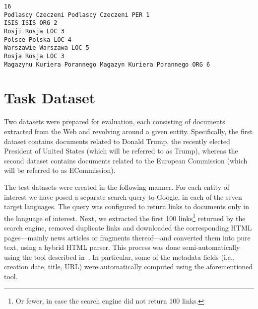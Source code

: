 \documentclass[11pt]{article}
\begin{document}
\begin{small}
\begin{verbatim}
16
Podlascy Czeczeni Podlascy Czeczeni PER 1
ISIS ISIS ORG 2
Rosji Rosja LOC 3
Polsce Polska LOC 4
Warszawie Warszawa LOC 5
Rosja Rosja LOC 3
Magazynu Kuriera Porannego Magazyn Kuriera Porannego ORG 6
\end{verbatim}	    
\end{small}

\section{Task Dataset}
\label{sec:annotation}

Two datasets were prepared for evaluation, each consisting of documents
extracted from the Web and revolving around a given entity.
Specifically, the first dataset contains documents related to Donald
Trump, the recently elected President of United States (which will be
referred to as {\sc Trump}), whereas the second dataset contains
documents related to the European Commission (which will be referred to
as {\sc ECommission}).

The test datasets were created in the following manner.  For each entity
of interest we have posed a separate search query to Google, in each of
the seven target languages.  The query was configured to return links to
documents only in the language of interest.  Next, we extracted the first
100 links\footnote{Or fewer, in case the search engine did not return 100
  links.} returned by the search engine, removed duplicate links and
downloaded the corresponding HTML pages---mainly news articles or
fragments thereof---and converted them into pure text, using a hybrid
HTML parser.  This process was done semi-automatically using the tool
described in~\cite{Crawley:ea:2010}.  In particular, some of the metadata
fields (i.e., creation date, title, URL) were automatically computed
using the aforementioned tool.
\end{document}
